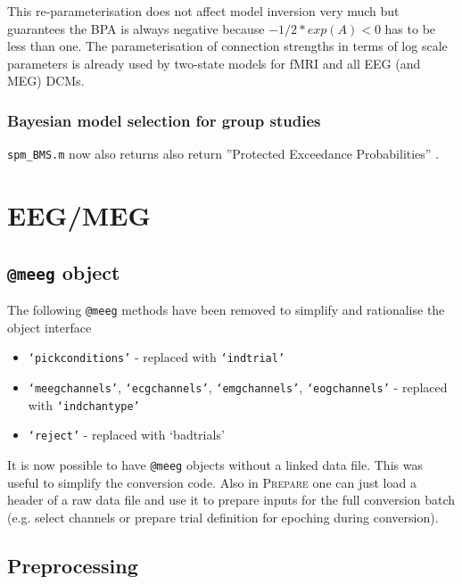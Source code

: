 \documentclass[a4paper,titlepage,openany]{article}
\begin{document}
\begin{multicols}{2}
This re-parameterisation does not affect model inversion very much but guarantees the BPA is always negative because $-1/2*exp(A) < 0$ has to be less than one. The parameterisation of connection strengths in terms of log scale parameters is already used by two-state models for fMRI and all EEG (and MEG) DCMs.

\subsubsection{Bayesian model selection for group studies}

\texttt{spm\_BMS.m} now also returns also return ''Protected Exceedance Probabilities'' \cite{Rigoux2014}.

\section{EEG/MEG}

\subsection{\texttt{@meeg} object}

The following \texttt{@meeg} methods have been removed to simplify and rationalise the object interface
\begin{itemize}
\item \texttt{`pickconditions'} - replaced with \texttt{`indtrial'}
\item \texttt{`meegchannels'}, \texttt{`ecgchannels'}, \texttt{`emgchannels'},  \texttt{`eogchannels'} - replaced with \texttt{`indchantype'}
\item \texttt{`reject'} - replaced with {`badtrials'}
\end{itemize}

It is now possible to have \texttt{@meeg} objects without a linked data file. This was useful to simplify the conversion code. Also in \textsc{Prepare} one can just load a header of a raw data file and use it to prepare inputs for the full conversion batch (e.g. select channels or prepare trial definition for epoching during conversion).

\subsection{Preprocessing}


\end{multicols}
\end{document}
